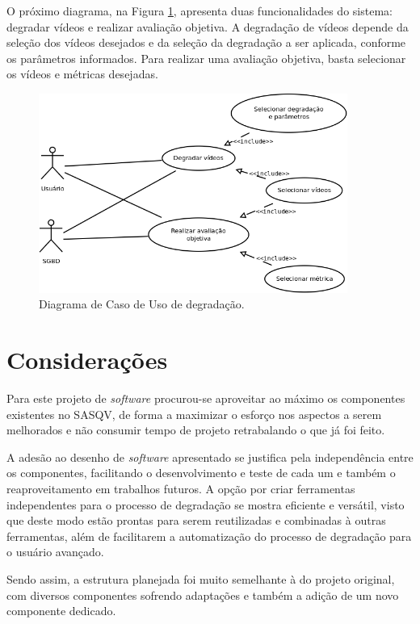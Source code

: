 O próximo diagrama, na Figura \ref{fig:ucddegradacao}, apresenta duas funcionalidades do sistema: degradar vídeos e realizar avaliação objetiva. A degradação de vídeos depende da seleção dos vídeos desejados e da seleção da degradação a ser aplicada, conforme os parâmetros informados. Para realizar uma avaliação objetiva, basta selecionar os vídeos e métricas desejadas.

\begin{figure}[!htb]
	\centering
	\includegraphics[width=0.9\textwidth]{./diagramas/degradacao.png}
	\caption{Diagrama de Caso de Uso de degradação.}
	\label{fig:ucddegradacao}
\end{figure}

\section{Considerações}

Para este projeto de \emph{software} procurou-se aproveitar ao máximo os componentes existentes no SASQV, de forma a maximizar o esforço nos aspectos a serem melhorados e não consumir tempo de projeto retrabalando o que já foi feito. 

A adesão ao desenho de \emph{software} apresentado se justifica pela independência entre os componentes, facilitando o desenvolvimento e teste de cada um e também o reaproveitamento em trabalhos futuros.
A opção por criar ferramentas independentes para o processo de degradação se mostra eficiente e versátil, visto que deste modo estão prontas para serem reutilizadas e combinadas à outras ferramentas, além de facilitarem a automatização do processo de degradação para o usuário avançado.

Sendo assim, a estrutura planejada foi muito semelhante à do projeto original, com diversos componentes sofrendo adaptações e também a adição de um novo componente dedicado.
